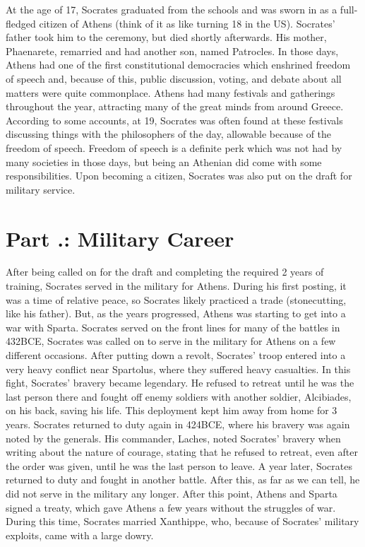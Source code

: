 At the age of 17, Socrates graduated from the schools and was sworn in as a full-fledged citizen of Athens (think of it as like turning 18 in the US). Socrates' father took him to the ceremony, but died shortly afterwards. His mother, Phaenarete, remarried and had another son, named Patrocles.  In those days, Athens had one of the first constitutional democracies which enshrined freedom of speech and, because of this, public discussion, voting, and debate about all matters were quite commonplace. Athens had many festivals and gatherings throughout the year, attracting many of the great minds from around Greece. According to some accounts, at 19, Socrates was often found at these festivals discussing things with the philosophers of the day, allowable because of the freedom of speech. Freedom of speech is a definite perk which was not had by many societies in those days, but being an Athenian did come with some responsibilities. Upon becoming a citizen, Socrates was also put on the draft for military service.
\section{Part \thechapcount.\theseccount: Military Career}

After being called on for the draft and completing the required 2 years of training, Socrates served in the military for Athens. During his first posting, it was a time of relative peace, so Socrates likely practiced a trade (stonecutting, like his father). But, as the years progressed, Athens was starting to get into a war with Sparta. Socrates served on the front lines for many of the battles in 432BCE,  Socrates was called on to serve in the military for Athens on a few different occasions. After putting down a revolt, Socrates' troop entered into a very heavy conflict near Spartolus, where they suffered heavy casualties. In this fight, Socrates' bravery became legendary. He refused to retreat until he was the last person there and fought off enemy soldiers with another soldier, Alcibiades, on his back, saving his life. This deployment kept him away from home for 3 years. Socrates returned to duty again in 424BCE, where his bravery was again noted by the generals. His commander, Laches, noted Socrates' bravery when writing about the nature of courage, stating that he refused to retreat, even after the order was given, until he was the last person to leave. A year later, Socrates returned to duty and fought in another battle. After this, as far as we can tell, he did not serve in the military any longer. After this point, Athens and Sparta signed a treaty, which gave Athens a few years without the struggles of war. During this time, Socrates married Xanthippe, who, because of Socrates' military exploits, came with a large dowry.
